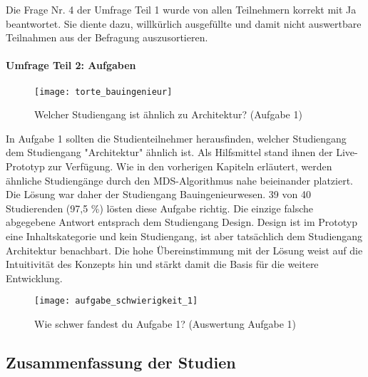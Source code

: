 Die Frage Nr. 4 der Umfrage Teil 1 wurde von allen Teilnehmern korrekt mit \glqq Ja\grqq{} beantwortet. Sie diente dazu, willkürlich ausgefüllte und damit nicht auswertbare Teilnahmen aus der Befragung auszusortieren.

\paragraph{Umfrage Teil 2: Aufgaben}

\begin{figure}[H]
    \centering
    \texttt{[image: torte\_bauingenieur]}
    \caption{Welcher Studiengang ist ähnlich zu Architektur? (Aufgabe 1)}
    \label{fig:prototyp-umfrage-bauingenieur}
\end{figure}

In Aufgabe 1 sollten die Studienteilnehmer herausfinden, welcher Studiengang dem Studiengang "Architektur" ähnlich ist. Als Hilfsmittel stand ihnen der Live-Prototyp zur Verfügung. Wie in den vorherigen Kapiteln erläutert, werden ähnliche Studiengänge durch den MDS-Algorithmus nahe beieinander platziert. Die Lösung war daher der Studiengang \glqq Bauingenieurwesen\grqq{}. 39 von 40 Studierenden (97,5 \%) lösten diese Aufgabe richtig. Die einzige falsche abgegebene Antwort entsprach dem Studiengang \glqq Design\grqq{}. \glqq Design\grqq{} ist im Prototyp eine Inhaltskategorie und kein Studiengang, ist aber tatsächlich dem Studiengang \glqq Architektur\grqq{} benachbart. Die hohe Übereinstimmung mit der Lösung weist auf die Intuitivität des Konzepts hin und stärkt damit die Basis für die weitere Entwicklung.


\begin{figure}[H]
    \centering
    \texttt{[image: aufgabe\_schwierigkeit\_1]}
    \caption{Wie schwer fandest du Aufgabe 1? (Auswertung Aufgabe 1)}
    \label{fig:prototyp-umfrage-bauingenieur-schwierigkeit}
\end{figure}


\subsection{Zusammenfassung der Studien}